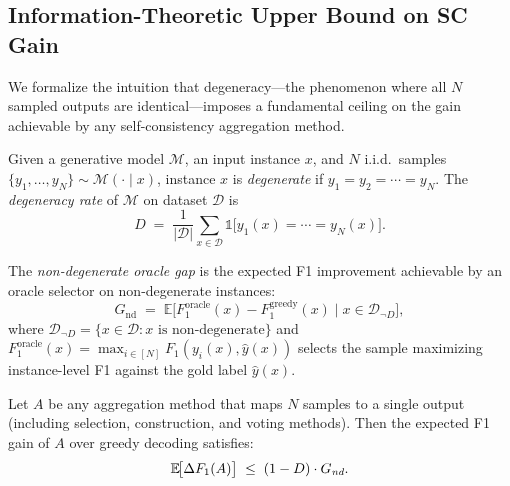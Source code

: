 
\subsection{Information-Theoretic Upper Bound on SC Gain}
\label{sec:degeneracy-bound}

We formalize the intuition that degeneracy---the phenomenon where all $N$ sampled outputs are identical---imposes a fundamental ceiling on the gain achievable by any self-consistency aggregation method.

\begin{definition}
\label{def:degeneracy}
Given a generative model $\mathcal{M}$, an input instance $x$, and $N$ i.i.d.\ samples $\{y_1, \ldots, y_N\} \sim \mathcal{M}(\cdot \mid x)$, instance $x$ is \emph{degenerate} if $y_1 = y_2 = \cdots = y_N$. The \emph{degeneracy rate} of $\mathcal{M}$ on dataset $\mathcal{D}$ is
\[
D \;=\; \frac{1}{|\mathcal{D}|} \sum_{x \in \mathcal{D}} \mathbb{1}\!\bigl[y_1(x) = \cdots = y_N(x)\bigr].
\]
\end{definition}

\begin{definition}
\label{def:oracle-gap}
The \emph{non-degenerate oracle gap} is the expected F1 improvement achievable by an oracle selector on non-degenerate instances:
\[
G_{\text{nd}} \;=\; \mathbb{E}\!\bigl[F_1^{\text{oracle}}(x) - F_1^{\text{greedy}}(x) \;\big|\; x \in \mathcal{D}_{\neg D}\bigr],
\]
where $\mathcal{D}_{\neg D} = \{x \in \mathcal{D} : x \text{ is non-degenerate}\}$ and $F_1^{\text{oracle}}(x) = \max_{i \in [N]} F_1(y_i(x), \hat{y}(x))$ selects the sample maximizing instance-level F1 against the gold label $\hat{y}(x)$.
\end{definition}

\begin{theorem}
\label{thm:degeneracy-bound}
Let $A$ be any aggregation method that maps $N$ samples to a single output (including selection, construction, and voting methods). Then the expected F1 gain of $A$ over greedy decoding satisfies:
\begin{equation}
\label{eq:weak-bound}
\mathbb{E}\!\bigl[\Delta F_1(A)\bigr] \;\leq\; (1 - D) \cdot G_{\emph{nd}}.
\end{equation}
\end{theorem}

